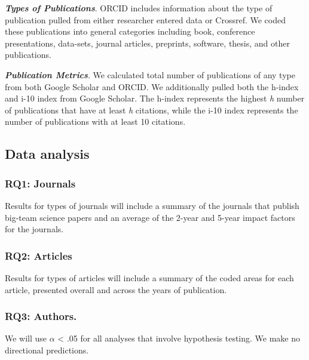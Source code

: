 \documentclass[
  man]{apa6}
\begin{document}
\textbf{\emph{Types of Publications}}. ORCID includes information about the type of publication pulled from either researcher entered data or Crossref. We coded these publications into general categories including book, conference presentations, data-sets, journal articles, preprints, software, thesis, and other publications.

\textbf{\emph{Publication Metrics}}. We calculated total number of publications of any type from both Google Scholar and ORCID. We additionally pulled both the h-index and i-10 index from Google Scholar. The h-index represents the highest \emph{h} number of publications that have at least \emph{h} citations, while the i-10 index represents the number of publications with at least 10 citations.

\hypertarget{data-analysis}{%
\subsection{Data analysis}\label{data-analysis}}

\hypertarget{rq1-journals}{%
\subsubsection{RQ1: Journals}\label{rq1-journals}}

Results for types of journals will include a summary of the journals that publish big-team science papers and an average of the 2-year and 5-year impact factors for the journals.

\hypertarget{rq2-articles}{%
\subsubsection{RQ2: Articles}\label{rq2-articles}}

Results for types of articles will include a summary of the coded areas for each article, presented overall and across the years of publication.

\hypertarget{rq3-authors.}{%
\subsubsection{\texorpdfstring{RQ3: Authors.\\
}{RQ3: Authors. }}\label{rq3-authors.}}

We will use \(\alpha\) \textless{} .05 for all analyses that involve hypothesis testing. We make no directional predictions.
\end{document}
